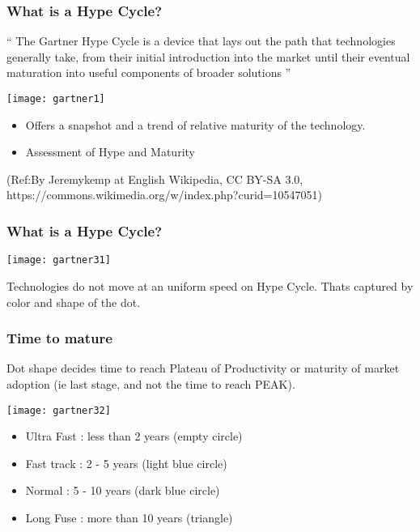 \begin{frame}[fragile]\frametitle{What is a Hype Cycle?}

`` The Gartner Hype Cycle is a device that lays out the path that technologies generally take, from their initial introduction into the market until their eventual maturation into useful components of broader solutions '' 


\begin{center}
\texttt{[image: gartner1]}
\end{center}

\begin{itemize}
\item Offers a snapshot and a trend of relative maturity of the technology.
\item Assessment of Hype and Maturity
\end{itemize}

{\tiny (Ref:By Jeremykemp at English Wikipedia, CC BY-SA 3.0, https://commons.wikimedia.org/w/index.php?curid=10547051)}

\end{frame}



\begin{frame}[fragile]\frametitle{What is a Hype Cycle?}

\begin{center}
\texttt{[image: gartner31]}
\end{center}


Technologies do not move at an uniform speed on Hype Cycle. Thats captured by color and shape of the dot. 
\end{frame}

\begin{frame}[fragile]\frametitle{Time to mature}


Dot shape decides time to reach Plateau of Productivity or maturity of market adoption (ie last stage, and not the time to reach PEAK).

\begin{center}
\texttt{[image: gartner32]}
\end{center}



\begin{itemize}
\item Ultra Fast : less than 2 years (empty circle)
\item Fast track : 2 - 5 years (light blue circle)
\item Normal : 5 - 10 years (dark blue circle)
\item Long Fuse : more than 10 years (triangle)
\end{itemize}
\end{frame}






